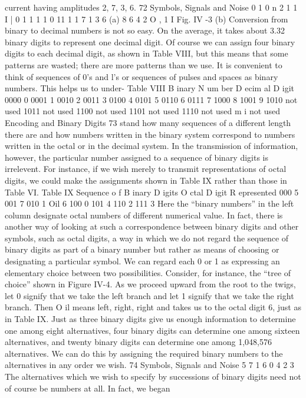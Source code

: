 current having amplitudes 2, 7, 3, 6.
72 Symbols, Signals and Noise
0 1 0
n
2
1 1 I | 0 1 1 1 1 0
11 1
1
7 1 3
6
(a)
8
6
4
2
O
,
1 I
Fig. IV -3
(b)
Conversion from binary to decimal numbers is not so easy. On
the average, it takes about 3.32 binary digits to represent one
decimal digit. Of course we can assign four binary digits to each
decimal digit, as shown in Table VIII, but this means that some
patterns are wasted; there are more patterns than we use.
It is convenient to think of sequences of 0’s and l’s or sequences
of pulses and spaces as binary numbers. This helps us to under-
Table VIII
B inary N um ber D ecim al D igit
0000 0
0001 1
0010 2
0011 3
0100 4
0101 5
0110 6
0111 7
1000 8
1001 9
1010 not used
1011 not used
1100 not used
1101 not used
1110 not used
m i not used
Encoding and Binary Digits
73
stand how many sequences of a different length there are and how
numbers written in the binary system correspond to numbers
written in the octal or in the decimal system. In the transmission
of information, however, the particular number assigned to a
sequence of binary digits is irrelevent. For instance, if we wish
merely to transmit representations of octal digits, we could make
the assignments shown in Table IX rather than those in Table VI.
Table IX
Sequence o f B inary D igits O ctal D igit R epresented
000 5
001 7
010 1
Oil 6
100 0
101 4
110 2
111 3
Here the “binary numbers” in the left column designate octal
numbers of different numerical value.
In fact, there is another way of looking at such a correspondence
between binary digits and other symbols, such as octal digits, a way
in which we do not regard the sequence of binary digits as part of
a binary number but rather as means of choosing or designating
a particular symbol.
We can regard each 0 or 1 as expressing an elementary choice
between two possibilities. Consider, for instance, the “tree of
choice” shown in Figure IV-4. As we proceed upward from the root
to the twigs, let 0 signify that we take the left branch and let 1
signify that we take the right branch. Then O il means left,
right, right and takes us to the octal digit 6, just as in Table IX.
Just as three binary digits give us enough information to determine
one among eight alternatives, four binary digits can determine
one among sixteen alternatives, and twenty binary digits can determine
one among 1,048,576 alternatives. We can do this by assigning
the required binary numbers to the alternatives in any order
we wish.
74 Symbols, Signals and Noise
5 7 1 6 0 4 2 3
The alternatives which we wish to specify by successions of
binary digits need not of course be numbers at all. In fact, we began
